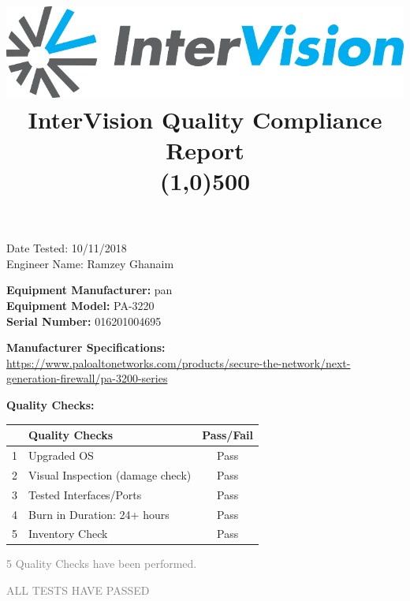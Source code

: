 \documentclass[12pt]{article}
\author{}
\title{\includegraphics[scale=1]{IV_logo.png}
\\InterVision Quality Compliance Report\\\line(1,0){500}\vspace{-8ex}}
\date{}
\begin{document}
\maketitle
\begin{flushright}
Date Tested: 10/11/2018\\
Engineer Name: Ramzey Ghanaim\\
\end{flushright}
\begin{flushleft}
\textbf{Equipment Manufacturer: } pan\\
\textbf{Equipment Model: } PA-3220\\
\textbf{Serial Number: } 016201004695\\
\end{flushleft}
\begin{flushleft}
\textbf{Manufacturer Specifications:} \\\url{https://www.paloaltonetworks.com/products/secure-the-network/next-generation-firewall/pa-3200-series} \\
\end{flushleft}
\begin{flushleft}
\textbf{Quality Checks:} 
\end{flushleft}
\begin{table}[H]
\centering
\begin{tabular}{|c|l|c|}
 \hline
& \textbf{Quality Checks}  & \textbf{Pass/Fail} \\ \hline
1& Upgraded OS & Pass \\ \hline
2& Visual Inspection (damage check) & Pass \\ \hline
3& Tested Interfaces/Ports & Pass \\ \hline
4& Burn in Duration: 24+ hours & Pass \\ \hline
5& Inventory Check & Pass  \\ \hline
\end{tabular}
\end{table}
\begin{center}
\textcolor{gray}{\huge 5 Quality Checks have been performed.}

\textcolor{gray}{\huge ALL TESTS HAVE PASSED}
\end{center}
\end{document}
